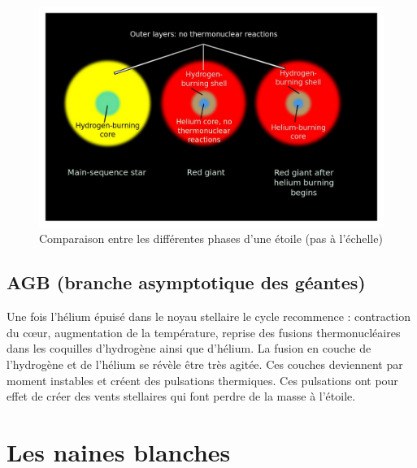 \begin{figure}[H]\vspace{1cm}
	\centering
	\includegraphics[scale=0.3]{images/helium-flash}
	\caption{Comparaison entre les différentes phases d'une étoile (pas à l'échelle)}
\end{figure}

\subsection{AGB (branche asymptotique des géantes)}

Une fois l’hélium épuisé dans le noyau stellaire le cycle recommence : contraction du cœur, augmentation de la température, reprise des fusions thermonucléaires dans les coquilles d’hydrogène ainsi que d’hélium. La fusion en couche de l’hydrogène et de l’hélium se révèle être très agitée. Ces couches deviennent par moment instables et créent des pulsations thermiques. Ces pulsations ont pour effet de créer des vents stellaires qui font perdre de la masse à l’étoile.

\section{Les naines blanches}

